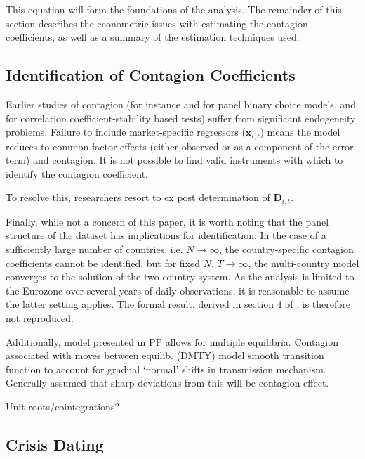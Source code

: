 \documentclass[../base.tex]{subfiles}
\begin{document}
This equation will form the foundations of the analysis. The remainder of this section describes the econometric issues with estimating the contagion coefficients, as well as a summary of the estimation techniques used. 

\subsection{Identification of Contagion Coefficients}
\label{ident}

Earlier studies of contagion (for instance \cite{eichengreen1996contagious} and \cite{esquivel1998explaining} for panel binary choice models, \cite{forbes2002no} and \cite{corsetti2005some} for correlation coefficient-stability based tests) suffer from significant endogeneity problems. Failure to include market-specific regressors ($\mathbf{x}_{i, t}$) means the model reduces to common factor effects (either observed or as a component of the error term) and contagion. It is not possible to find valid instruments with which to identify the contagion coefficient. 

To resolve this, researchers resort to ex post determination of $\mathbf{D}_{i,t}$. 







Finally, while not a concern of this paper, it is worth noting that the panel structure of the dataset has implications for identification. In the case of a sufficiently large number of countries, i.e. $N \rightarrow \infty$, the country-specific contagion coefficients cannot be identified, but for fixed $N$, $T \rightarrow \infty$, the multi-country model converges to the solution of the two-country system. As the analysis is limited to the Eurozone over several years of daily observations, it is reasonable to assume the latter setting applies. The formal result, derived in section 4 of \cite{pesaran2007econometric}, is therefore not reproduced.




Additionally, model presented in PP allows for multiple equilibria. Contagion associated with moves between equilib. \cite{dungey2015endogenous} (DMTY) model smooth transition function to account for gradual `normal' shifts in transmission mechanism. Generally assumed that sharp deviations from this will be contagion effect. 

Unit roots/cointegrations?


\subsection{Crisis Dating}
\label{dating_methodology}
\end{document}
